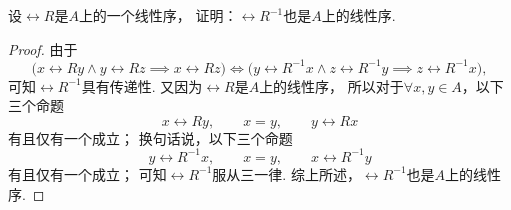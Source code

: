 \begin{example}
设\(\rel{R}\)是\(A\)上的一个线性序，
证明：\(\rel{R}^{-1}\)也是\(A\)上的线性序.
\begin{proof}
由于\[
	\bigl( x \rel{R} y \land y \rel{R} z \implies x \rel{R} z \bigr)
	\iff
	\bigl( y \rel{R}^{-1} x \land z \rel{R}^{-1} y \implies z \rel{R}^{-1} x \bigr),
\]
可知\(\rel{R}^{-1}\)具有传递性.
又因为\(\rel{R}\)是\(A\)上的线性序，
所以对于\(\forall x,y \in A\)，以下三个命题\[
	x \rel{R} y, \qquad
	x = y, \qquad
	y \rel{R} x
\]有且仅有一个成立；
换句话说，以下三个命题\[
	y \rel{R}^{-1} x, \qquad
	x = y, \qquad
	x \rel{R}^{-1} y
\]有且仅有一个成立；
可知\(\rel{R}^{-1}\)服从三一律.
综上所述，\(\rel{R}^{-1}\)也是\(A\)上的线性序.
\end{proof}
\end{example}
